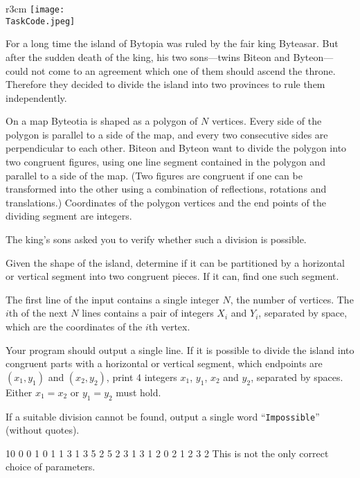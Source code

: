 \documentclass{boi2014}
\renewcommand{\TaskCode}{demarcation}
\newcommand{\constant}[1]{{\tt #1}}
\begin{document}
    \begin{wrapfigure}{r}{3cm}
        \vspace{-24pt}
		\texttt{[image: \\TaskCode.jpeg]}
	\end{wrapfigure}

    For a long time the island of Bytopia was ruled by the fair king
    Byteasar. But after the sudden death
    of the king, his two sons---twins Biteon and Byteon---could
    not come to an agreement which one of them should ascend the throne.
    Therefore they decided to divide the island into two provinces to
    rule them independently.  
 
    On a map Byteotia is shaped as a polygon of $N$ vertices. Every
    side of the polygon is parallel to a side of the map, and every
    two consecutive sides are perpendicular to each other.  Biteon
    and Byteon want to divide the polygon into two congruent figures,
    using one line segment contained in the polygon and parallel to a
    side of the map.  (Two figures are congruent if one can be transformed
    into the other using a combination of reflections, rotations and
    translations.) Coordinates of the polygon vertices and the end points
    of the dividing segment are integers.  
 
    The king's sons asked you to verify whether such a division is
    possible.

    \Task

    Given the shape of the island, determine if it can be partitioned
    by a horizontal or vertical segment into two congruent pieces. If
    it can, find one such segment.

    \Input
	The first line of the input contains a single integer $N$, the number of
	vertices. The $i$th of the next $N$ lines contains a pair of integers $X_i$
	and $Y_i$, separated by space, which are the coordinates of the $i$th
	vertex.

	\Output
	Your program should output a single line. If it is possible to divide the
	island into congruent parts with a horizontal or vertical segment, which
	endpoints are $(x_1, y_1)$ and $(x_2, y_2)$, print 4 integers $x_1$,
	$y_1$, $x_2$ and $y_2$, separated by spaces.
	Either $x_1 = x_2$ or $y_1 = y_2$ must hold.

	If a suitable division cannot be found, output a single word
	``\constant{Impossible}'' (without quotes).

    \Examples
	\example
	{
		10
		0 0
		1 0
		1 1
		3 1
		3 5
		2 5
		2 3
		1 3
		1 2
		0 2
	}
	{
		1 2 3 2
	}
	{
		This is not the only correct choice of parameters.
	}
\end{document}
